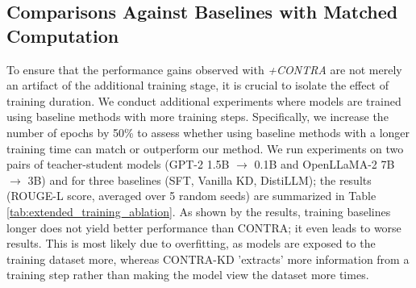 \documentclass{article} %
\theoremstyle{definition}
\theoremstyle{remark}
\begin{document}
\subsection{Comparisons Against Baselines with Matched Computation}

To ensure that the performance gains observed with \textit{+CONTRA} are not merely an artifact of the additional training stage, it is crucial to isolate the effect of training duration. We conduct additional experiments where models are trained using baseline methods with more training steps. Specifically, we increase the number of epochs by 50\% to assess whether using baseline methods with a longer training time can match or outperform our method. We run experiments on two pairs of teacher-student models (GPT-2 1.5B $\rightarrow$ 0.1B and OpenLLaMA-2 7B $\rightarrow$ 3B) and for three baselines (SFT, Vanilla KD, DistiLLM); the results (ROUGE-L score, averaged over 5 random seeds) are summarized in Table \ref{tab:extended_training_ablation}. As shown by the results, training baselines longer does not yield better performance than CONTRA; it even leads to worse results. This is most likely due to overfitting, as models are exposed to the training dataset more, whereas CONTRA-KD 'extracts' more information from a training step rather than making the model view the dataset more times.
\end{document}
